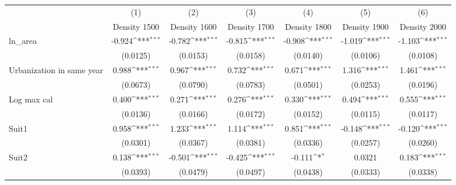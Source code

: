 {
\def\sym#1{\ifmmode^{#1}\else\(^{#1}\)\fi}
\begin{tabular}{l*{6}{c}}
\toprule
                    &\multicolumn{1}{c}{(1)}&\multicolumn{1}{c}{(2)}&\multicolumn{1}{c}{(3)}&\multicolumn{1}{c}{(4)}&\multicolumn{1}{c}{(5)}&\multicolumn{1}{c}{(6)}\\
                    &\multicolumn{1}{c}{Density 1500}&\multicolumn{1}{c}{Density 1600}&\multicolumn{1}{c}{Density 1700}&\multicolumn{1}{c}{Density 1800}&\multicolumn{1}{c}{Density 1900}&\multicolumn{1}{c}{Density 2000}\\
\midrule
ln\_area             &      -0.924\sym{***}&      -0.782\sym{***}&      -0.815\sym{***}&      -0.908\sym{***}&      -1.019\sym{***}&      -1.103\sym{***}\\
                    &    (0.0125)         &    (0.0153)         &    (0.0158)         &    (0.0140)         &    (0.0106)         &    (0.0108)         \\
\addlinespace
Urbanization in same year&       0.988\sym{***}&       0.967\sym{***}&       0.732\sym{***}&       0.671\sym{***}&       1.316\sym{***}&       1.461\sym{***}\\
                    &    (0.0673)         &    (0.0790)         &    (0.0783)         &    (0.0501)         &    (0.0253)         &    (0.0196)         \\
\addlinespace
Log max cal         &       0.400\sym{***}&       0.271\sym{***}&       0.276\sym{***}&       0.330\sym{***}&       0.494\sym{***}&       0.555\sym{***}\\
                    &    (0.0136)         &    (0.0166)         &    (0.0172)         &    (0.0152)         &    (0.0115)         &    (0.0117)         \\
\addlinespace
Suit1               &       0.958\sym{***}&       1.233\sym{***}&       1.114\sym{***}&       0.851\sym{***}&      -0.148\sym{***}&      -0.120\sym{***}\\
                    &    (0.0301)         &    (0.0367)         &    (0.0381)         &    (0.0336)         &    (0.0257)         &    (0.0260)         \\
\addlinespace
Suit2               &       0.138\sym{***}&      -0.501\sym{***}&      -0.425\sym{***}&      -0.111\sym{*}  &      0.0321         &       0.183\sym{***}\\
                    &    (0.0393)         &    (0.0479)         &    (0.0497)         &    (0.0438)         &    (0.0333)         &    (0.0338)         \\

\end{tabular}}
